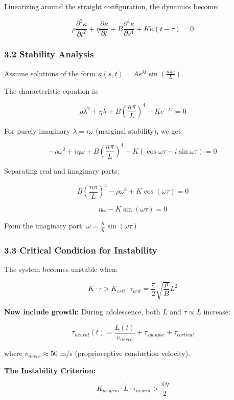 \documentclass[11pt,a4paper]{article}
\begin{document}
Linearizing around the straight configuration, the dynamics become:

$$
\rho \frac{\partial^2 \kappa}{\partial t^2} + \eta \frac{\partial \kappa}{\partial t} + B \frac{\partial^4 \kappa}{\partial s^4} + K \kappa(t-\tau) = 0
$$

\subsubsection{3.2 Stability Analysis}

Assume solutions of the form $\kappa(s,t) = A e^{\lambda t} \sin\left(\frac{n\pi s}{L}\right)$.

The characteristic equation is:

$$
\rho \lambda^2 + \eta \lambda + B \left(\frac{n\pi}{L}\right)^4 + K e^{-\lambda \tau} = 0
$$

For purely imaginary $\lambda = i\omega$ (marginal stability), we get:

$$
-\rho \omega^2 + i\eta\omega + B \left(\frac{n\pi}{L}\right)^4 + K(\cos\omega\tau - i\sin\omega\tau) = 0
$$

Separating real and imaginary parts:

$$
B \left(\frac{n\pi}{L}\right)^4 - \rho \omega^2 + K\cos(\omega\tau) = 0 \tag{Real}
$$

$$
\eta \omega - K \sin(\omega\tau) = 0 \tag{Imaginary}
$$

From the imaginary part: $\omega = \frac{K}{\eta}\sin(\omega\tau)$

\subsubsection{3.3 Critical Condition for Instability}

The system becomes unstable when:

$$
K \cdot \tau > K_{crit} \cdot \tau_{crit} = \frac{\pi}{2}\sqrt{\frac{\rho}{B}} L^2
$$

\textbf{Now include growth:} During adolescence, both $L$ and $\tau \propto L$ increase:

$$
\tau_{neural}(t) = \frac{L(t)}{v_{nerve}} + \tau_{synapse} + \tau_{cortical}
$$

where $v_{nerve} \approx 50$ m/s (proprioceptive conduction velocity).

\textbf{The Instability Criterion:}

$$
\boxed{
K_{proprio} \cdot \dot{L} \cdot \tau_{neural} > \frac{\pi \eta}{2}
}
$$
\end{document}
